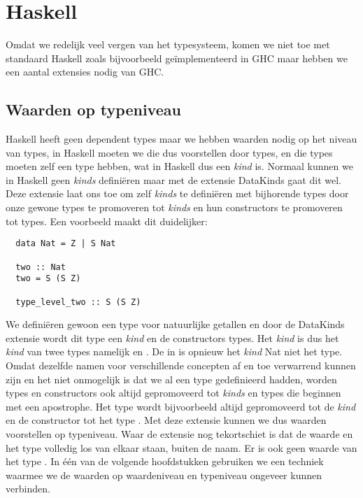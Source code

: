 \section{Haskell}

Omdat we redelijk veel vergen van het typesysteem, komen we niet toe met
standaard Haskell zoals bijvoorbeeld geïmplementeerd in GHC maar hebben we een
aantal extensies nodig van GHC.

\subsection{Waarden op typeniveau}

Haskell heeft geen dependent types maar we hebben waarden nodig op het niveau
van types, in Haskell moeten we die dus voorstellen door types, en die types
moeten zelf een type hebben, wat in Haskell dus een \emph{kind} is. Normaal
kunnen we in Haskell geen \emph{kinds} definiëren maar met de extensie DataKinds
gaat dit wel.  Deze extensie laat ons toe om zelf \emph{kinds} te definiëren
met bijhorende types door onze gewone types te promoveren tot \emph{kinds} en
hun constructors te promoveren tot types. Een voorbeeld maakt dit duidelijker:

\begin{verbatim}
  data Nat = Z | S Nat

  two :: Nat
  two = S (S Z)

  type_level_two :: S (S Z)
\end{verbatim}

We definiëren gewoon een type voor natuurlijke getallen en door de DataKinds
extensie wordt dit type een \emph{kind} en de constructors types. Het
\emph{kind}  is dus het \emph{kind} van twee types namelijk
 en . De  in  is opnieuw het
\emph{kind} Nat niet het type. Omdat dezelfde namen voor verschillende
concepten af en toe verwarrend kunnen zijn en het niet onmogelijk is dat we al
een type  gedefinieerd hadden, worden types en constructors ook altijd
gepromoveerd tot \emph{kinds} en types die beginnen met een apostrophe. Het
type  wordt bijvoorbeeld altijd gepromoveerd tot de \emph{kind}
 en de constructor  tot het type .  Met deze
extensie kunnen we dus waarden voorstellen op typeniveau. Waar de extensie nog
tekortschiet is dat de waarde  en het type  volledig los van
elkaar staan, buiten de naam. Er is ook geen waarde van het type . In
één van de volgende hoofdstukken gebruiken we een techniek waarmee we de
waarden op waardeniveau en typeniveau ongeveer kunnen verbinden.

